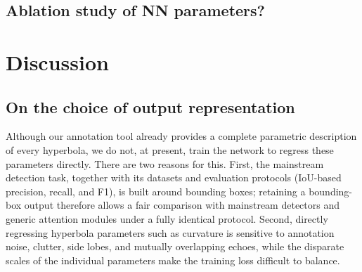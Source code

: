 \documentclass[lettersize,journal]{IEEEtran}
\begin{document}
\subsection{Ablation study of NN parameters?}
\section{Discussion}
\subsection{On the choice of output representation}


Although our annotation tool already provides a complete parametric description
of every hyperbola, we do not, at present, train the network to regress these
parameters directly. 
There are two reasons for this. 
First, the mainstream detection task, together with its datasets and evaluation protocols (IoU-based
precision, recall, and F1), is built around bounding boxes; retaining a
bounding-box output therefore allows a fair comparison with mainstream detectors
and generic attention modules under a fully identical protocol. 
Second, directly regressing hyperbola parameters such as curvature is sensitive to annotation
noise, clutter, side lobes, and mutually overlapping echoes, while the disparate
scales of the individual parameters make the training loss difficult to balance.


\end{document}
